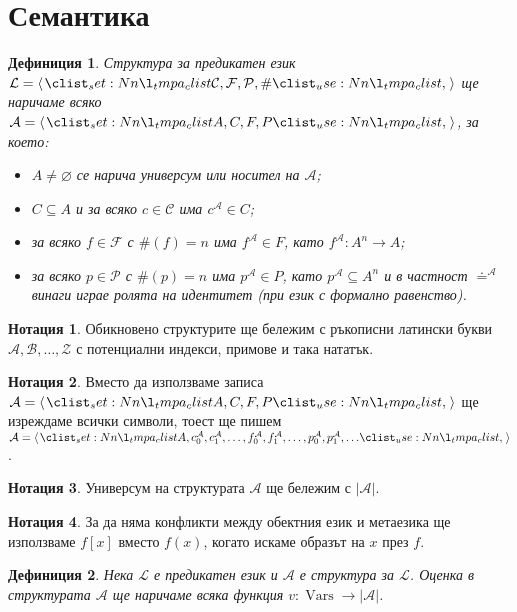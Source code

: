 \documentclass[12pt]{article}
\newcommand{\vars}{\operatorname{Vars}}
\newcommand{\calA}{\mathcal{A}}
\newcommand{\calL}{\mathcal{L}}
\newcommand{\calZ}{\mathcal{Z}}
\newcommand{\calF}{\mathcal{F}}
\newcommand{\calP}{\mathcal{P}}
\newcommand{\calC}{\mathcal{C}}
\newcommand{\calB}{\mathcal{B}}
\newtheorem*{definition}{Дефиниция}
\theoremstyle{definition}
\newtheorem*{notation}{Нотация}
\begin{document}
\newpage

\section{Семантика}

\begin{definition}
	Структура за предикатен език $\calL = \opair{\calC, \calF, \calP, \#}$ ще наричаме всяко $\calA = \opair{A, C, F, P}$, за което:
	\begin{itemize}
		\item $A \neq \varnothing$ се нарича универсум или носител на $\calA$;
		\item $C \subseteq A$ и за всяко $c \in \calC$ има $c^\calA \in C$;
		\item за всяко $f \in \calF$ с $\#(f) = n$ има $f^\calA \in F$, като $f^\calA : A^n \rightarrow A$;
		\item за всяко $p \in \calP$ с $\#(p) = n$ има $p^\calA \in P$, като $p^\calA \subseteq A^n$ и в частност $\doteq^\calA$ винаги играе ролята на идентитет (при език с формално равенство).
	\end{itemize}
\end{definition}

\begin{notation}
	Обикновено структурите ще бележим с ръкописни латински букви $\calA, \calB, \dots, \calZ$ с потенциални индекси, примове и така нататък.
\end{notation}

\begin{notation}
	Вместо да използваме записа $\calA = \opair{A, C, F, P}$ ще изреждаме всички символи, тоест ще пишем $\calA = \opair{A, c_0^\calA, c_1^\calA, \dots, f_0^\calA, f_1^\calA, \dots, p_0^\calA, p_1^\calA, \dots}$.
\end{notation}

\begin{notation}
	Универсум на структурата $\calA$ ще бележим с $|\calA|$.
\end{notation}

\begin{notation}
	За да няма конфликти между обектния език и метаезика ще използваме $f[x]$ вместо $f(x)$, когато искаме образът на $x$ през $f$.
\end{notation}

\begin{definition}
	Нека $\calL$ е предикатен език и $\calA$ е структура за $\calL$.
	Оценка в структурата $\calA$ ще наричаме всяка функция $v : \vars \rightarrow |\calA|$.
\end{definition}
\end{document}
